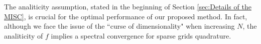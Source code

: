 \FloatBarrier

\begin{remark}
The analiticity assumption, stated in the beginning of Section \ref{sec:Details of the MISC}, is crucial for the optimal performance of our proposed method. In fact, although we face the issue of the  ``curse of dimensionality" when increasing $N$, the analiticity of $f$ implies a spectral convergence for sparse grids quadrature.
\end{remark} 
%


